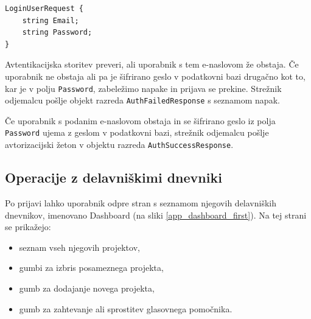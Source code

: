 \documentclass[a4paper, 12pt]{book}
\begin{document}
\begin{verbatim}
LoginUserRequest {
    string Email; 
    string Password; 
} 
\end{verbatim}

Avtentikacijska storitev preveri, ali uporabnik s tem e-naslovom že obstaja.
Če uporabnik ne obstaja ali pa je šifrirano geslo v podatkovni bazi drugačno kot to, kar je v polju \texttt{Password}, zabeležimo napake in prijava se prekine.
Strežnik odjemalcu pošlje objekt razreda \texttt{AuthFailedResponse} s seznamom napak.

Če uporabnik s podanim e-naslovom obstaja in se šifrirano geslo iz polja \texttt{Password} ujema z geslom v podatkovni bazi, strežnik odjemalcu pošlje avtorizacijski žeton v objektu razreda \texttt{AuthSuccessResponse}.




\subsection{Operacije z delavniškimi dnevniki}

Po prijavi lahko uporabnik odpre stran s seznamom njegovih delavniških dnevnikov, imenovano Dashboard (na sliki \ref{app_dashboard_first}).
Na tej strani se prikažejo:
\begin{itemize}
	\item seznam vseh njegovih projektov, 
	\item gumbi za izbris posameznega projekta,
	\item gumb za dodajanje novega projekta, 
	\item gumb za zahtevanje ali sprostitev glasovnega pomočnika.
\end{itemize}

\end{document}
